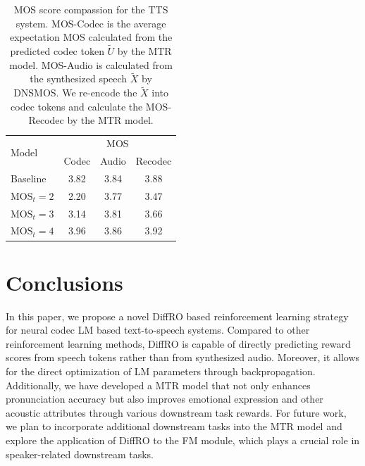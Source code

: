 \documentclass[a4paper]{article}
\begin{document}
\begin{table}[!t]
    \centering
    \begin{tabular}{l ccc}
    \hline
             \multirow{2}{*}{Model} & \multicolumn{3}{c}{MOS}  \\
         & Codec & Audio & Recodec   \\
    \hline
        Baseline &  3.82 & 3.84 & 3.88 \\
        $\text{MOS}_{t}=2$ &  2.20 &  3.77 & 3.47 \\
        $\text{MOS}_{t}=3$ &  3.14 &  3.81 & 3.66 \\
        $\text{MOS}_{t}=4$ &  3.96 &  3.86 & 3.92 \\

    \hline
    \end{tabular}
    \caption{MOS score compassion for the TTS system. MOS-Codec is the average expectation MOS calculated from the predicted codec token $\tilde{U}$ by the MTR model. MOS-Audio is calculated from the synthesized speech $\tilde{X}$ by DNSMOS. We re-encode the $\tilde{X}$ into codec tokens and calculate the MOS-Recodec by the MTR model.}
    \label{tab:mos_result}
\end{table}



\section{Conclusions}
\label{S:5}

In this paper, we propose a novel DiffRO based reinforcement learning strategy for neural codec LM based text-to-speech systems. Compared to other reinforcement learning methods, DiffRO is capable of directly predicting reward scores from speech tokens rather than from synthesized audio. Moreover, it allows for the direct optimization of LM parameters through backpropagation.
Additionally, we have developed a MTR model that not only enhances pronunciation accuracy but also improves emotional expression and other acoustic attributes through various downstream task rewards.
For future work, we plan to incorporate additional downstream tasks into the MTR model and explore the application of DiffRO to the FM module, which plays a crucial role in speaker-related downstream tasks.
\end{document}
